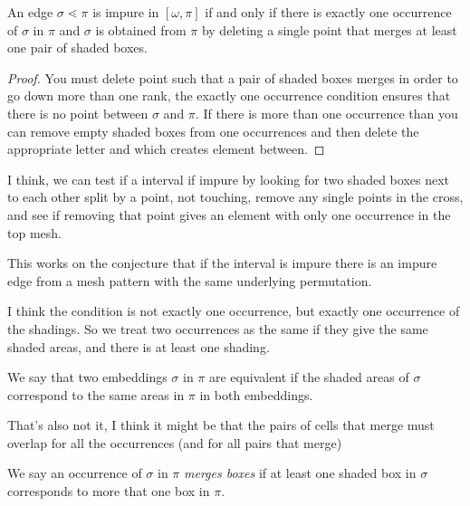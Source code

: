 \documentclass[11pt,a4paper,oneside]{article}
\begin{document}
\begin{conj}
An edge $\sigma\lessdot\pi$ is impure in $[\omega,\pi]$ if and only if there is exactly one occurrence of $\sigma$ in $\pi$ and $\sigma$ is obtained from $\pi$ by deleting a single point that merges at least one pair of shaded boxes.
\begin{proof}
You must delete  point such that  a pair of shaded boxes merges in order to go down more than one rank, the exactly one occurrence condition ensures that there is no point between $\sigma$ and $\pi$. If there is more than one occurrence than you can remove empty shaded boxes from one occurrences and then delete the appropriate letter and which creates element between.
\end{proof}
\end{conj}

I think, we can test if a interval if impure by looking for two shaded boxes next to each other split by a point, not touching, remove any single points in the cross, and see if removing that point gives an element with only one occurrence in the top mesh.

This works on the conjecture that if the interval is impure there is an impure edge from a mesh pattern with the same underlying permutation.

I think the condition is not exactly one occurrence, but exactly one occurrence of the shadings. So we treat two occurrences as the same if they give the same shaded areas, and there is at least one shading.

We say that two embeddings $\sigma$ in $\pi$ are equivalent if the shaded areas of $\sigma$ correspond to the same areas in $\pi$ in both embeddings.

That's also not it, I think it might be that the pairs of cells that merge must overlap for all the occurrences (and for all pairs that merge)

We say an occurrence of $\sigma$ in $\pi$ \emph{merges boxes} if at least one shaded box in $\sigma$ corresponds to more that one box in $\pi$.
\end{document}
